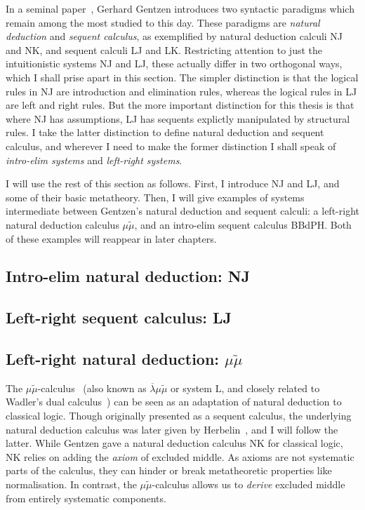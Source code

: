 In a seminal paper~\cite{Gentzen64}, Gerhard Gentzen introduces two syntactic
paradigms which remain among the most studied to this day.
These paradigms are \emph{natural deduction} and \emph{sequent calculus}, as
exemplified by natural deduction calculi NJ and NK, and sequent calculi LJ and
LK.
Restricting attention to just the intuitionistic systems NJ and LJ, these
actually differ in two orthogonal ways, which I shall prise apart in this
section.
The simpler distinction is that the logical rules in NJ are introduction and
elimination rules, whereas the logical rules in LJ are left and right rules.
But the more important distinction for this thesis is that where NJ has
assumptions, LJ has sequents explictly manipulated by structural rules.
I take the latter distinction to define natural deduction and sequent calculus,
and wherever I need to make the former distinction I shall speak of
\emph{intro-elim systems} and \emph{left-right systems}.

I will use the rest of this section as follows.
First, I introduce NJ and LJ, and some of their basic metatheory.
Then, I will give examples of systems intermediate between Gentzen's natural
deduction and sequent calculi: a left-right natural deduction calculus
$\mu\tilde\mu$, and an intro-elim sequent calculus BBdPH\@.
Both of these examples will reappear in later chapters.

\subsection{Intro-elim natural deduction: NJ}

\subsection{Left-right sequent calculus: LJ}

\subsection{Left-right natural deduction: $\mu\tilde\mu$}
The $\mu\tilde\mu$-calculus~\cite{CH00} (also known as
$\overline\lambda\mu\tilde\mu$ or system L, and closely related to Wadler's
dual calculus~\cite{Wadler03}) can be seen as an adaptation of natural deduction
to classical logic.
Though originally presented as a sequent calculus, the underlying natural
deduction calculus was later given by Herbelin~\cite[p.\ 12]{herbelin-hab}, and
I will follow the latter.
While Gentzen gave a natural deduction calculus NK for classical logic, NK
relies on adding the \emph{axiom} of excluded middle.
As axioms are not systematic parts of the calculus, they can hinder or break
metatheoretic properties like normalisation.
In contrast, the $\mu\tilde\mu$-calculus allows us to \emph{derive} excluded
middle from entirely systematic components.

